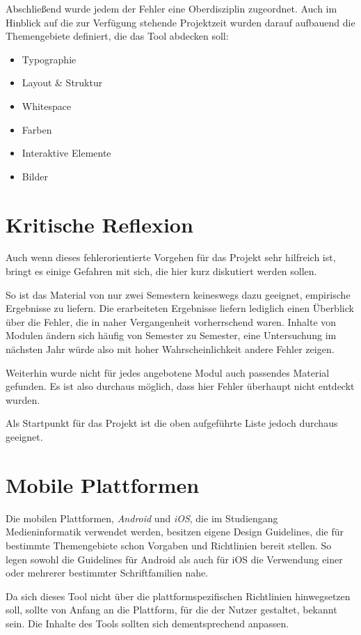 Abschließend wurde jedem der Fehler eine Oberdisziplin zugeordnet. Auch im Hinblick auf die zur Verfügung stehende Projektzeit wurden darauf aufbauend die Themengebiete definiert, die das Tool abdecken soll:
\begin{itemize}
	\item Typographie
	\item Layout \& Struktur
	\item Whitespace
	\item Farben
	\item Interaktive Elemente
	\item Bilder
\end{itemize}



\section{Kritische Reflexion}
Auch wenn dieses fehlerorientierte Vorgehen für das Projekt sehr hilfreich ist, bringt es einige Gefahren mit sich, die hier kurz diskutiert werden sollen.

So ist das Material von nur zwei Semestern keineswegs dazu geeignet, empirische Ergebnisse zu liefern. Die erarbeiteten Ergebnisse liefern lediglich einen Überblick über die Fehler, die in naher Vergangenheit vorherrschend waren. Inhalte von Modulen ändern sich häufig von Semester zu Semester, eine Untersuchung im nächsten Jahr würde also mit hoher Wahrscheinlichkeit andere Fehler zeigen.

Weiterhin wurde nicht für jedes angebotene Modul auch passendes Material gefunden. Es ist also durchaus möglich, dass hier Fehler überhaupt nicht entdeckt wurden.

Als Startpunkt für das Projekt ist die oben aufgeführte Liste jedoch durchaus geeignet.



\section{Mobile Plattformen} \label{Mobile Plattformen}
Die mobilen Plattformen, \textit{Android} und \textit{iOS}, die im Studiengang Medieninformatik verwendet werden, besitzen eigene Design Guidelines, die für bestimmte Themengebiete schon Vorgaben und Richtlinien bereit stellen. So legen sowohl die Guidelines für Android als auch für iOS die Verwendung einer oder mehrerer bestimmter Schriftfamilien nahe.

Da sich dieses Tool nicht über die plattformspezifischen Richtlinien hinwegsetzen soll, sollte von Anfang an die Plattform, für die der Nutzer gestaltet, bekannt sein. Die Inhalte des Tools sollten sich dementsprechend anpassen.


\clearpage
